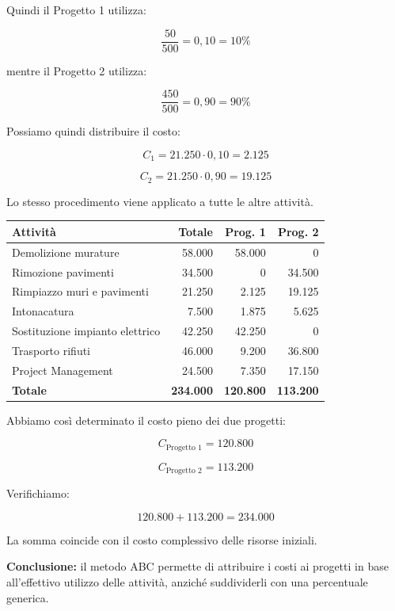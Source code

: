 \noindent Quindi il Progetto 1 utilizza:

\[
\frac{50}{500}=0{,}10=10\%
\]

\noindent mentre il Progetto 2 utilizza:

\[
\frac{450}{500}=0{,}90=90\%
\]

\noindent Possiamo quindi distribuire il costo:

\[
C_1=21.250\cdot0{,}10=\boxed{2.125}
\]

\[
C_2=21.250\cdot0{,}90=\boxed{19.125}
\]

\noindent Lo stesso procedimento viene applicato
a tutte le altre attività.

\begin{center}
\scriptsize
\begin{tabular}{|p{4cm}|r|r|r|}
\hline
\textbf{Attività} &
\textbf{Totale} &
\textbf{Prog. 1} &
\textbf{Prog. 2} \\
\hline
Demolizione murature & 58.000 & 58.000 & 0 \\
\hline
Rimozione pavimenti & 34.500 & 0 & 34.500 \\
\hline
Rimpiazzo muri e pavimenti & 21.250 & 2.125 & 19.125 \\
\hline
Intonacatura & 7.500 & 1.875 & 5.625 \\
\hline
Sostituzione impianto elettrico & 42.250 & 42.250 & 0 \\
\hline
Trasporto rifiuti & 46.000 & 9.200 & 36.800 \\
\hline
Project Management & 24.500 & 7.350 & 17.150 \\
\hline
\textbf{Totale} &
\textbf{234.000} &
\textbf{120.800} &
\textbf{113.200} \\
\hline
\end{tabular}
\end{center}

\noindent Abbiamo così determinato
il costo pieno dei due progetti:

\[
\boxed{
C_{\text{Progetto 1}}=120.800
}
\]

\[
\boxed{
C_{\text{Progetto 2}}=113.200
}
\]

\noindent Verifichiamo:

\[
120.800+113.200=\boxed{234.000}
\]

\noindent La somma coincide con il costo
complessivo delle risorse iniziali.

\medskip

\noindent \textbf{Conclusione:} il metodo ABC
permette di attribuire i costi ai progetti
in base all'effettivo utilizzo delle attività,
anziché suddividerli con una percentuale generica.


